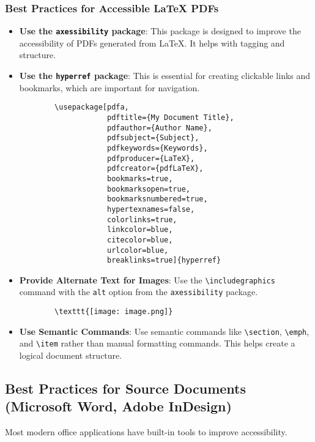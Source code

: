 \subsubsection{Best Practices for Accessible LaTeX PDFs}
\label{ssubsec:accessible-latex-pdfs}
\begin{itemize}
	\item \textbf{Use the \texttt{axessibility} package}: This package is designed to improve the accessibility of PDFs generated from LaTeX. It helps with tagging and structure.
	\item \textbf{Use the \texttt{hyperref} package}: This is essential for creating clickable links and bookmarks, which are important for navigation.
	      \begin{verbatim}
        \usepackage[pdfa,
                    pdftitle={My Document Title},
                    pdfauthor={Author Name},
                    pdfsubject={Subject},
                    pdfkeywords={Keywords},
                    pdfproducer={LaTeX},
                    pdfcreator={pdfLaTeX},
                    bookmarks=true,
                    bookmarksopen=true,
                    bookmarksnumbered=true,
                    hypertexnames=false,
                    colorlinks=true,
                    linkcolor=blue,
                    citecolor=blue,
                    urlcolor=blue,
                    breaklinks=true]{hyperref}
    \end{verbatim}
	\item \textbf{Provide Alternate Text for Images}: Use the \texttt{\textbackslash includegraphics} command with the \texttt{alt} option from the \texttt{axessibility} package.
	      \begin{verbatim}
        \texttt{[image: image.png]}
    \end{verbatim}
	\item \textbf{Use Semantic Commands}: Use semantic commands like \texttt{\textbackslash section}, \texttt{\textbackslash emph}, and \texttt{\textbackslash item} rather than manual formatting commands. This helps create a logical document structure.
\end{itemize}

\subsection{Best Practices for Source Documents (Microsoft Word, Adobe InDesign)}
\label{subsec:best-practices-source-docs}
Most modern office applications have built-in tools to improve accessibility.

